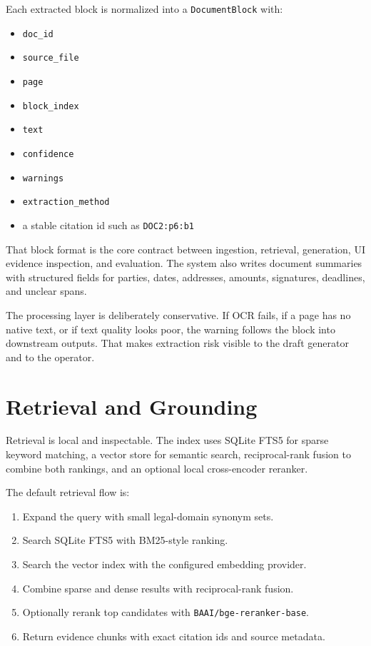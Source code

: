 \documentclass[11pt]{article}
\newcommand{\code}[1]{\texttt{#1}}
\begin{document}
Each extracted block is normalized into a \code{DocumentBlock} with:

\begin{itemize}
  \item \code{doc\_id}
  \item \code{source\_file}
  \item \code{page}
  \item \code{block\_index}
  \item \code{text}
  \item \code{confidence}
  \item \code{warnings}
  \item \code{extraction\_method}
  \item a stable citation id such as \code{DOC2:p6:b1}
\end{itemize}

That block format is the core contract between ingestion, retrieval, generation, UI evidence inspection, and evaluation. The system also writes document summaries with structured fields for parties, dates, addresses, amounts, signatures, deadlines, and unclear spans.

The processing layer is deliberately conservative. If OCR fails, if a page has no native text, or if text quality looks poor, the warning follows the block into downstream outputs. That makes extraction risk visible to the draft generator and to the operator.

\section{Retrieval and Grounding}

Retrieval is local and inspectable. The index uses SQLite FTS5 for sparse keyword matching, a vector store for semantic search, reciprocal-rank fusion to combine both rankings, and an optional local cross-encoder reranker.

The default retrieval flow is:

\begin{enumerate}
  \item Expand the query with small legal-domain synonym sets.
  \item Search SQLite FTS5 with BM25-style ranking.
  \item Search the vector index with the configured embedding provider.
  \item Combine sparse and dense results with reciprocal-rank fusion.
  \item Optionally rerank top candidates with \code{BAAI/bge-reranker-base}.
  \item Return evidence chunks with exact citation ids and source metadata.
\end{enumerate}
\end{document}
